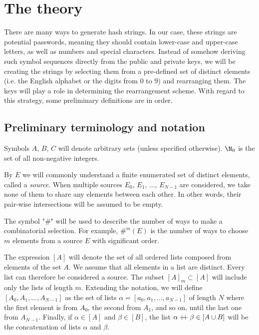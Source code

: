 \documentclass[12pt, a4paper]{article}
\newcommand{\dop}{\mathbin{{+}\hspace{-1mm}{+}}}
\begin{document}
\section{The theory}

There are many ways to generate hash strings. In our case, these strings are potential passwords, meaning they should contain lower-case and upper-case letters, as well as numbers and special characters. Instead of somehow deriving such symbol sequences directly from the public and private keys, we will be creating the strings by selecting them from a pre-defined set of distinct elements (i.e. the English alphabet or the digits from 0 to 9) and rearranging them. The keys will play a role in determining the rearrangement scheme. With regard to this strategy, some preliminary definitions are in order.

\subsection{Preliminary terminology and notation}

Symbols $ A $, $ B $, $ C $ will denote arbitrary sets (unless specified otherwise). $ \N_0 $ is the set of all non-negative integers.

By $ E $ we will commonly understand a finite enumerated set of distinct elements, called a \emph{source}. When multiple sources $ E_0 $, $ E_1 $, ..., $ E_{N-1} $ are considered, we take none of them to share any elements between each other. In other words, their pair-wise intersections will be assumed to be empty.

The symbol "$ \# $" will be used to describe the number of ways to make a combinatorial selection. For example, $ \#^m(E) $ is the number of ways to choose $ m $ elements from a source $ E $ with significant order.

The expression $ [A] $ will denote the set of all ordered lists composed from elements of the set $ A $. We assume that all elements in a list are distinct. Every list can therefore be considered a source. The subset $ [A]_m \subset [A] $ will include only the lists of length $ m $. Extending the notation, we will define $ [A_0, A_1, ..., A_{N-1}] $ as the set of lists $ \alpha = [a_0, a_1, ..., a_{N-1}] $ of length $ N $ where the first element is from $ A_0 $, the second from $ A_1 $, and so on, until the last one from $ A_{N-1} $. Finally, if $ \alpha \in [A] $ and $ \beta \in [B] $, the list $ \alpha \dop \beta \in [A \cup B] $ will be the concatenation of lists $ \alpha $ and $ \beta $.
\end{document}
